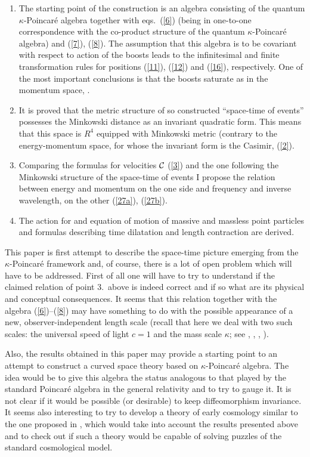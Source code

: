 \documentclass[a4paper,a4paper]{article}
\begin{document}
\begin{enumerate}

\item The starting point of the construction is an algebra consisting of the quantum $\kappa$-Poincar\'e algebra together with eqs.~(\ref{6}) (being in one-to-one correspondence with the co-product structure of the quantum $\kappa$-Poincar\'e algebra) and (\ref{7}), (\ref{8}). The assumption that this algebra is to be covariant with respect to action of the boosts leads to the infinitesimal and finite transformation rules for positions (\ref{11}), (\ref{12}) and (\ref{16}), respectively. One of the most important conclusions is that the boosts saturate as in the momentum space, \cite{rbgacjkg}.
\item It is proved that the metric structure of so constructed ``space-time of events'' possesses the Minkowski distance as an invariant quadratic form. This means that this space is $R^4$ equipped with Minkowski metric (contrary to the energy-momentum space, for whose the invariant form is the Casimir, (\ref{2}).
\item Comparing the formulas for velocities ${\cal C}$ (\ref{3}) and the one following the Minkowski structure of the space-time of events I propose the relation between energy and momentum on the one side and frequency and inverse wavelength, on the other (\ref{27a}), (\ref{27b}).
\item The action for and equation of motion of massive and massless point particles and formulas describing time dilatation and length contraction are derived. 
\end{enumerate}


This paper is first attempt to describe the space-time picture emerging from the $\kappa$-Poincar\'e framework and, of course, there is a lot of open problem which will have to be addressed. First of all one will have to try to understand if the claimed relation of point 3.~above is indeed correct and if so what are its physical and conceptual consequences. It seems that this relation together with the algebra (\ref{6})--(\ref{8}) may have something to do with the possible appearance of a new, observer-independent length scale (recall that here we deal with two such scales: the universal speed of light $c=1$ and the mass scale $\kappa$; see \cite{gac1}, \cite{gac2}, \cite{jkgminl}, \cite{rbgacjkg}).

Also, the results obtained in this paper may provide a starting point to an attempt to construct a curved space theory based on $\kappa$-Poincar\'e algebra. The idea would be to give this algebra the status analogous to that played by the standard Poincar\'e algebra in the general relativity and to try to gauge it. It is not clear if it would be possible (or desirable) to keep diffeomorphism invariance. It seems also interesting to try to develop a theory of early cosmology similar to the one proposed in \cite{stjo}, which would take into account the results presented above and to check out if such a theory would be capable of solving  puzzles of the standard cosmological model.
\end{document}
